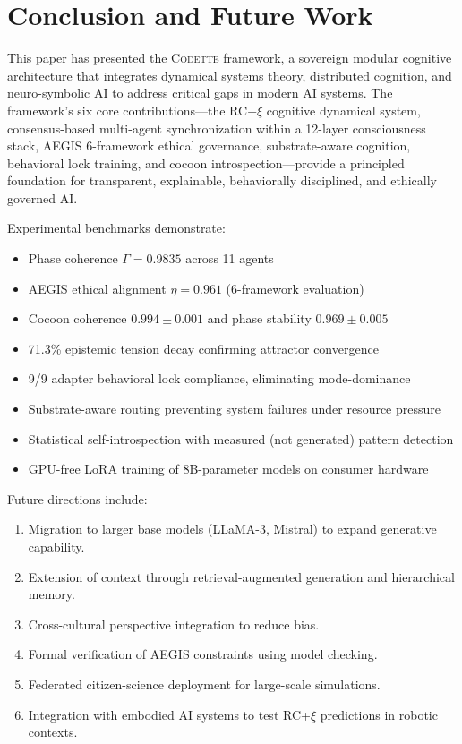 \documentclass[11pt,a4paper]{article}
\newcommand{\rcxi}{RC+$\xi$}
\newcommand{\codette}{\textsc{Codette}}
\begin{document}
\section{Conclusion and Future Work}
\label{sec:conclusion}

This paper has presented the \codette{} framework, a sovereign modular cognitive architecture that integrates dynamical systems theory, distributed cognition, and neuro-symbolic AI to address critical gaps in modern AI systems. The framework's six core contributions---the \rcxi{} cognitive dynamical system, consensus-based multi-agent synchronization within a 12-layer consciousness stack, AEGIS 6-framework ethical governance, substrate-aware cognition, behavioral lock training, and cocoon introspection---provide a principled foundation for transparent, explainable, behaviorally disciplined, and ethically governed AI.

Experimental benchmarks demonstrate:
\begin{itemize}[leftmargin=*]
  \item Phase coherence $\Gamma = 0.9835$ across 11 agents
  \item AEGIS ethical alignment $\eta = 0.961$ (6-framework evaluation)
  \item Cocoon coherence $0.994 \pm 0.001$ and phase stability $0.969 \pm 0.005$
  \item 71.3\% epistemic tension decay confirming attractor convergence
  \item 9/9 adapter behavioral lock compliance, eliminating mode-dominance
  \item Substrate-aware routing preventing system failures under resource pressure
  \item Statistical self-introspection with measured (not generated) pattern detection
  \item GPU-free LoRA training of 8B-parameter models on consumer hardware
\end{itemize}

Future directions include:
\begin{enumerate}[leftmargin=*]
  \item Migration to larger base models (LLaMA-3, Mistral) to expand generative capability.
  \item Extension of context through retrieval-augmented generation and hierarchical memory.
  \item Cross-cultural perspective integration to reduce bias.
  \item Formal verification of AEGIS constraints using model checking.
  \item Federated citizen-science deployment for large-scale simulations.
  \item Integration with embodied AI systems to test \rcxi{} predictions in robotic contexts.
\end{enumerate}
\end{document}
